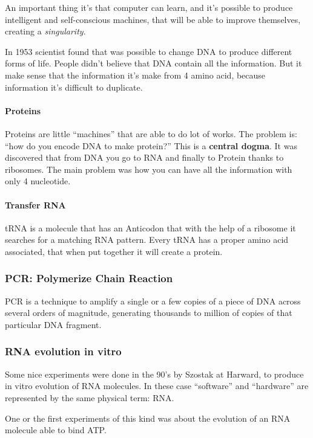 An important thing it's that computer can learn, and it's possible to produce
intelligent and self-conscious machines, that will be able to improve themselves,
creating a \textit{singularity}.

In 1953 scientist found that was possible to change DNA to produce different forms
of life. People didn't believe that DNA contain all the information.
But it make sense that the information it's make from 4 amino acid, because
information it's difficult to duplicate.

\paragraph*{Proteins} Proteins are little ``machines'' that are able to do lot
of works. The problem is: ``how do you encode DNA to make protein?'' This is a
\textbf{central dogma}. It was discovered that from DNA you go to RNA and
finally to Protein thanks to ribosomes.
The main problem was how you can have all the information with only
4 nucleotide.

\paragraph*{Transfer RNA} tRNA is a molecule that has an Anticodon that with
the help of a ribosome it searches for a matching RNA pattern. Every tRNA has a
proper amino acid associated, that when put together it will create a protein.

\subsubsection{PCR: Polymerize Chain Reaction}
PCR is a technique to amplify a single or a few copies of a piece of DNA across
several orders of magnitude, generating thousands to million of copies of that
particular DNA fragment.

\subsubsection{RNA evolution in vitro}
Some nice experiments were done in the 90's by Szostak at Harward, to produce
in vitro evolution of RNA molecules. In these case ``software'' and ``hardware''
are represented by the same physical term: RNA.

One or the first experiments of this kind was about the evolution of an RNA
molecule able to bind ATP.
